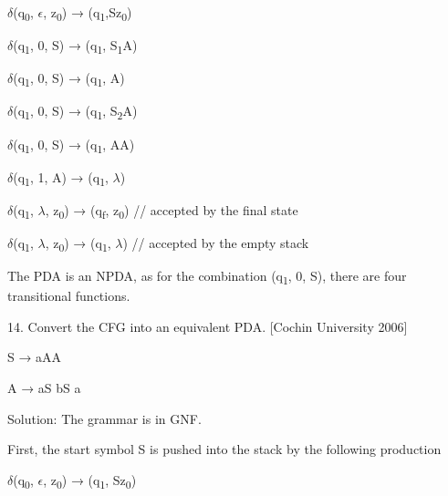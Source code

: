 \documentclass[]{article}
\begin{document}
\begin{center}
	$\delta$(q\textsubscript{0}, $\epsilon$, z\textsubscript{0}) → (q\textsubscript{1},Sz\textsubscript{0})
\end{center}
\begin{center}
	$\delta$(q\textsubscript{1}, 0, S) → (q\textsubscript{1}, S\textsubscript{1}A)
\end{center}
\begin{center}
	$\delta$(q\textsubscript{1}, 0, S) → (q\textsubscript{1}, A)
\end{center}
\begin{center}
	$\delta$(q\textsubscript{1}, 0, S) → (q\textsubscript{1}, S\textsubscript{2}A)
\end{center}
\begin{center}
	$\delta$(q\textsubscript{1}, 0, S) → (q\textsubscript{1}, AA)
\end{center}
\begin{center}
	$\delta$(q\textsubscript{1}, 1, A) → (q\textsubscript{1}, $\lambda$)
\end{center}
\begin{center}
	$\delta$(q\textsubscript{1}, $\lambda$, z\textsubscript{0}) → (q\textsubscript{f}, z\textsubscript{0}) // accepted by the final state
\end{center}

\begin{center}
	$\delta$(q\textsubscript{1}, $\lambda$, z\textsubscript{0}) → (q\textsubscript{1}, $\lambda$) // accepted by the empty stack
\end{center}

The PDA is an NPDA, as for the combination (q\textsubscript{1}, 0, S), there are four transitional functions.


14. Convert the CFG into an equivalent PDA. [Cochin University 2006]

\begin{center}
	S → aAA
\end{center}
\begin{center}
	A → aS \textbar{} bS \textbar{} a
\end{center}

Solution: The grammar is in GNF.

First, the start symbol S is pushed into the stack by the following production


\begin{center}
	$\delta$(q\textsubscript{0}, $\epsilon$, z\textsubscript{0}) → (q\textsubscript{1}, Sz\textsubscript{0})
\end{center}
\end{document}
